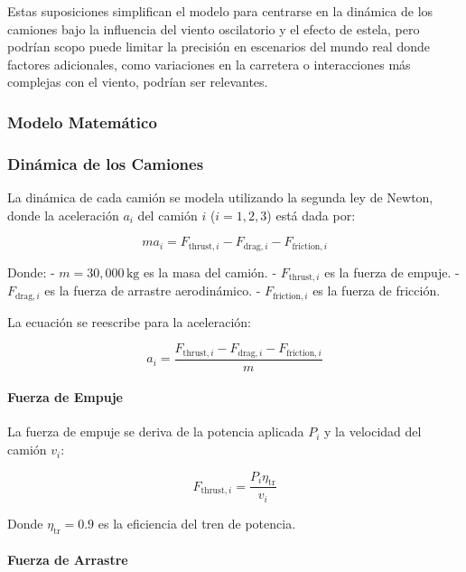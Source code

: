 \documentclass[11pt,stdletter,orderfromtodate,sigleft,twoside]{report}
\begin{document}
Estas suposiciones simplifican el modelo para centrarse en la dinámica de los camiones bajo la influencia del viento oscilatorio y el efecto de estela, pero podrían scopo puede limitar la precisión en escenarios del mundo real donde factores adicionales, como variaciones en la carretera o interacciones más complejas con el viento, podrían ser relevantes.

\subsubsection{Modelo Matemático}
\subsubsection{Dinámica de los Camiones}

La dinámica de cada camión se modela utilizando la segunda ley de Newton, donde la aceleración $a_i$ del camión $i$ ($i = 1, 2, 3$) está dada por:

\begin{equation}
m a_i = F_{\text{thrust},i} - F_{\text{drag},i} - F_{\text{friction},i}
\end{equation}

Donde:
- $m = 30,000 \, \text{kg}$ es la masa del camión.
- $F_{\text{thrust},i}$ es la fuerza de empuje.
- $F_{\text{drag},i}$ es la fuerza de arrastre aerodinámico.
- $F_{\text{friction},i}$ es la fuerza de fricción.

La ecuación se reescribe para la aceleración:

\begin{equation}
a_i = \frac{F_{\text{thrust},i} - F_{\text{drag},i} - F_{\text{friction},i}}{m}
\end{equation}

\paragraph{Fuerza de Empuje}

La fuerza de empuje se deriva de la potencia aplicada $P_i$ y la velocidad del camión $v_i$:

\begin{equation}
F_{\text{thrust},i} = \frac{P_i \eta_{\text{tr}}}{v_i}
\end{equation}

Donde $\eta_{\text{tr}} = 0.9$ es la eficiencia del tren de potencia.

\paragraph{Fuerza de Arrastre}
\end{document}

